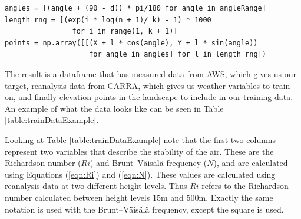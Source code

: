 \begin{lstlisting}[style = Python, caption = {Sector elevation points generated}, label = code:sectorElevation]
angles = [(angle + (90 - d)) * pi/180 for angle in angleRange]
length_rng = [(exp(i * log(n + 1)/ k) - 1) * 1000 
                for i in range(1, k + 1)]
points = np.array([[(X + l * cos(angle), Y + l * sin(angle))
                    for angle in angles] for l in length_rng])   
\end{lstlisting}

The result is a dataframe that has measured data from AWS, which gives us our target, reanalysis data from CARRA, which gives us weather variables to train on, and finally elevation points in the landscape to include in our training data. An example of what the data looks like can be seen in Table \ref{table:trainDataExample}.

\begin{table}[h]
    \caption[An example of data structure used to train model]{An example of data structure used to train model. Data points include the derived variables Richardson number ($Ri$) and Brunt-Väisäla frequency ($N$) (defined below), the elevation of the station, direction of wind and relative direction of the wind (twd, that is the direction of the wind relative to center of Iceland), along with some combination of wind speed, pressure and temperature at the different height levels. Finally there are the elevation points around a given station, where the elevation is relative to the station.}
    \label{table:trainDataExample}
\end{table}

Looking at Table \ref{table:trainDataExample} note that the first two columns represent two variables that describe the stability of the air. These are the Richardson number ($Ri$)\cite{richardson_number_skybrary} and Brunt–Väisälä frequency ($N$)\cite{brunt_vaisala_freq_eumtrain}, and are calculated using Equations (\ref{eqn:Ri}) and (\ref{eqn:N})\cite{mean_gust_HA_HO}. These values are calculated using reanalysis data at two different height levels. Thus $Ri$ refers to the Richardson number calculated between height levels 15m and 500m. Exactly the same notation is used with the Brunt–Väisälä frequency, except the square is used.

